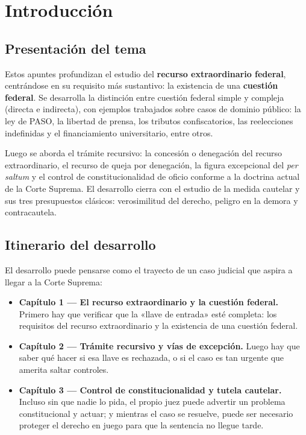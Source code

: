 \documentclass[12pt,oneside]{book}
\begin{document}
\tableofcontents

\chapter*{Introducción}
{}

\section*{Presentación del tema}

Estos apuntes profundizan el estudio del \textbf{recurso extraordinario federal}, centrándose en su requisito más sustantivo: la existencia de una \textbf{cuestión federal}. Se desarrolla la distinción entre cuestión federal simple y compleja (directa e indirecta), con ejemplos trabajados sobre casos de dominio público: la ley de PASO, la libertad de prensa, los tributos confiscatorios, las reelecciones indefinidas y el financiamiento universitario, entre otros.

Luego se aborda el trámite recursivo: la concesión o denegación del recurso extraordinario, el recurso de queja por denegación, la figura excepcional del \textit{per saltum} y el control de constitucionalidad de oficio conforme a la doctrina actual de la Corte Suprema. El desarrollo cierra con el estudio de la medida cautelar y sus tres presupuestos clásicos: verosimilitud del derecho, peligro en la demora y contracautela.

\section*{Itinerario del desarrollo}

El desarrollo puede pensarse como el trayecto de un caso judicial que aspira a llegar a la Corte Suprema:

\begin{itemize}
    \item \textbf{Capítulo 1 — El recurso extraordinario y la cuestión federal.} Primero hay que verificar que la «llave de entrada» esté completa: los requisitos del recurso extraordinario y la existencia de una cuestión federal.
    \item \textbf{Capítulo 2 — Trámite recursivo y vías de excepción.} Luego hay que saber qué hacer si esa llave es rechazada, o si el caso es tan urgente que amerita saltar controles.
    \item \textbf{Capítulo 3 — Control de constitucionalidad y tutela cautelar.} Incluso sin que nadie lo pida, el propio juez puede advertir un problema constitucional y actuar; y mientras el caso se resuelve, puede ser necesario proteger el derecho en juego para que la sentencia no llegue tarde.
\end{itemize}
\end{document}
